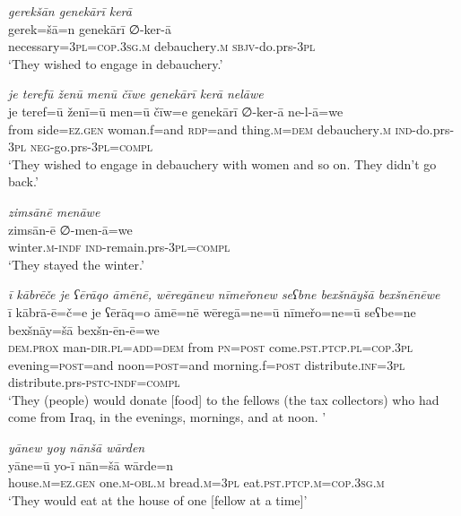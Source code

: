 \ea \label{BP.35}
\textit{gerekšān genekārī kerā} \\ 
\gll gerek=šā=n genekārī ∅-ker-ā \\ 
 necessary\textsc{=3pl}\textsc{=cop}\textsc{.3sg}\textsc{.m} debauchery\textsc{.m} \textsc{sbjv-}do.prs\textsc{-3pl} \\ 
\glt `They wished to engage in debauchery.'
\z 
 
\ea \label{BP.36}
\textit{je terefū ženū menū čīwe genekārī kerā nelāwe} \\ 
\gll je teref=ū ženī=ū men=ū čīw=e genekārī ∅-ker-ā ne-l-ā=we \\ 
 from side\textsc{=ez.gen} woman.f=and \textsc{rdp}=and thing\textsc{.m}\textsc{=dem} debauchery\textsc{.m} \textsc{ind-}do.prs\textsc{-3pl} \textsc{neg-}go.prs\textsc{-3pl}\textsc{=compl} \\ 
\glt `They wished to engage in debauchery with women and so on. They didn’t go back.'
\z 
 
\ea \label{BP.37}
\textit{zimsānē menāwe} \\ 
\gll zimsān-ē ∅-men-ā=we \\ 
 winter\textsc{.m}\textsc{-indf} \textsc{ind-}remain.prs\textsc{-3pl}\textsc{=compl} \\ 
\glt `They stayed the winter.'
\z 
 
\ea \label{BP.38}
\textit{ī kābrēče je ʕērāqo āmēnē, wēregānew nīmeřonew seʕbne bexšnāyšā bexšnēnēwe} \\ 
\gll ī kābrā-ē=č=e je ʕērāq=o āmē=nē wēregā=ne=ū nīmeřo=ne=ū seʕbe=ne bexšnāy=šā bexšn-ēn-ē=we \\ 
 \textsc{dem.prox} man\textsc{-dir}\textsc{.pl}\textsc{=add}\textsc{=dem} from \textsc{pn}\textsc{=\textsc{post}} come\textsc{.pst}\textsc{.ptcp}\textsc{.pl}\textsc{=cop}\textsc{.3pl} evening\textsc{=\textsc{post}}=and noon\textsc{=\textsc{post}}=and morning.f\textsc{=\textsc{post}} distribute\textsc{.inf}\textsc{=3pl} distribute.prs\textsc{-pstc}\textsc{-indf}\textsc{=compl} \\ 
\glt `They (people) would donate [food] to the fellows (the tax collectors) who had come from Iraq, in the evenings, mornings, and at noon. '
\z 
 
\ea \label{BP.39}
\textit{yānew yoy nānšā wārden} \\ 
\gll yāne=ū yo-ī nān=šā wārde=n \\ 
 house\textsc{.m}\textsc{=ez.gen} one\textsc{.m}\textsc{-obl}\textsc{.m} bread\textsc{.m}\textsc{=3pl} eat\textsc{.pst}\textsc{.ptcp}\textsc{.m}\textsc{=cop}\textsc{.3sg}\textsc{.m} \\ 
\glt `They would eat at the house of one [fellow at a time]'
\z 
 
